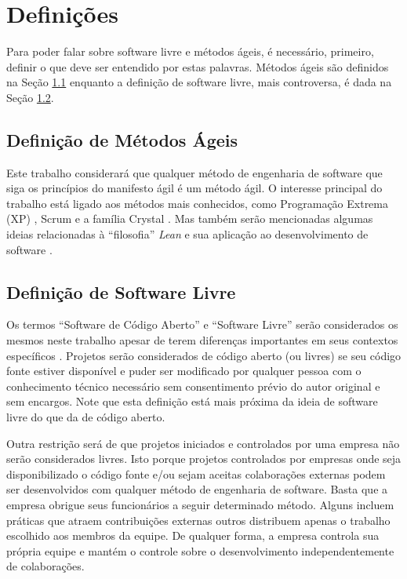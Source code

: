 \chapter{Definições}
\label{cap:definicoes}

Para poder falar sobre software livre e métodos ágeis, é necessário,
primeiro, definir o que deve ser entendido por estas palavras. Métodos
ágeis são definidos na Seção \ref{sec:agile-def} enquanto a definição
de software livre, mais controversa, é dada na Seção \ref{sec:os-def}.

\section{Definição de Métodos Ágeis}
\label{sec:agile-def}

Este trabalho considerará que qualquer método de engenharia de
software que siga os princípios do manifesto ágil
\cite{AgileManifesto} é um método ágil. O interesse principal do
trabalho está ligado aos métodos mais conhecidos, como Programação
Extrema (XP) \cite{XP02}, Scrum \cite{Schwaber2004} e a família
Crystal \cite{Cockburn2002}. Mas também serão mencionadas algumas
ideias relacionadas à ``filosofia'' \emph{Lean} \cite{Ohno1998} e sua
aplicação ao desenvolvimento de software \cite{Poppendieck2005}.

\section{Definição de Software Livre}
\label{sec:os-def}

Os termos ``Software de Código Aberto'' e ``Software Livre'' serão
considerados os mesmos neste trabalho apesar de terem diferenças
importantes em seus contextos específicos \cite[Ch. 1, Free Versus
Open source]{Fogel2005}. Projetos serão considerados de código aberto
(ou livres) se seu código fonte estiver disponível e puder ser
modificado por qualquer pessoa com o conhecimento técnico necessário
sem consentimento prévio do autor original e sem encargos. Note que
esta definição está mais próxima da ideia de software livre do que da
de código aberto.

Outra restrição será de que projetos iniciados e controlados por uma
empresa não serão considerados livres. Isto porque projetos
controlados por empresas onde seja disponibilizado o código fonte e/ou
sejam aceitas colaborações externas podem ser desenvolvidos com
qualquer método de engenharia de software. Basta que a empresa obrigue
seus funcionários a seguir determinado método. Alguns incluem práticas
que atraem contribuições externas outros distribuem apenas o trabalho
escolhido aos membros da equipe. De qualquer forma, a empresa controla
sua própria equipe e mantém o controle sobre o desenvolvimento
independentemente de colaborações.

